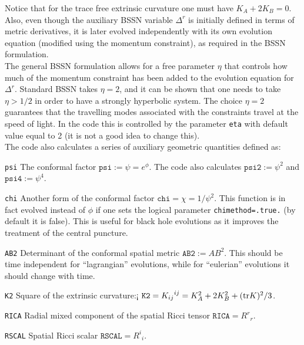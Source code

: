 \documentclass[12pt]{article}
\begin{document}
Notice that for the trace free extrinsic curvature one must have
\mbox{$K_A + 2K_B=0$}.  Also, even though the auxiliary BSSN variable
$\Delta^r$ is initially defined in terms of metric derivatives, it is
later evolved independently with its own evolution equation (modified
using the momentum constraint), as required in the BSSN
formulation. \\

The general BSSN formulation allows for a free parameter $\eta$ that
controls how much of the momentum constraint has been added to the
evolution equation for $\Delta^r$. Standard BSSN takes $\eta=2$, and
it can be shown that one needs to take $\eta>1/2$ in order to have a
strongly hyperbolic system. The choice $\eta=2$ guarantees that the
travelling modes associated with the constraints travel at the speed
of light. In the code this is controlled by the parameter \texttt{eta}
with default value equal to 2 (it is not a good idea to change
this). \\

The code also calculates a series of auxiliary geometric quantities
defined as:

\begin{list}{}{
\setlength{\leftmargin}{35mm}
\setlength{\labelsep}{10mm}
\setlength{\labelwidth}{20mm}}

\item[\texttt{psi}] The conformal factor $\texttt{psi}:=\psi=e^\phi$.
  The code also calculates $\texttt{psi2}:=\psi^2$ and
    $\texttt{psi4}:=\psi^4$.

\item[\texttt{chi}] Another form of the conformal factor
  $\texttt{chi}=\chi=1/\psi^2$.  This function is in fact evolved
  instead of $\phi$ if one sets the logical parameter
  \texttt{chimethod=.true.} (by default it is false).  This is useful
  for black hole evolutions as it improves the treatment of the
  central puncture.

\item[\texttt{AB2}] Determinant of the conformal spatial metric
  $\texttt{AB2} := A B^2$.  This should be time independent for
  ``lagrangian'' evolutions, while for ``eulerian'' evolutions it
  should change with time.

\item[\texttt{K2}] Square of the extrinsic curvature:¡
  $\texttt{K2}={K_{ij}}^{ij}=K_A^2 + 2 K_B^2 + ({\rm tr} K)^2/3$.

\item[\texttt{RICA}] Radial mixed component of the spatial Ricci
  tensor $\texttt{RICA}={R^r}_r$.

\item[\texttt{RSCAL}] Spatial Ricci scalar $\texttt{RSCAL}={R^i}_i$.

\end{list}
\end{document}
